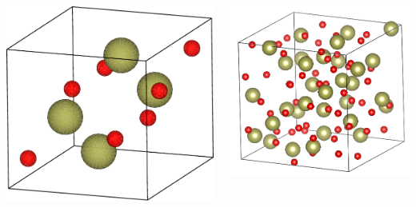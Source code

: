 \documentclass{beamer}
\begin{document}
\begin{frame}
\begin{columns}[c]
	\includegraphics[width=0.75\linewidth]{figures/monoclinic.pdf}

	\includegraphics[width=0.75\linewidth]{figures/am.png}
    \end{columns}

\end{frame}
\end{document}
